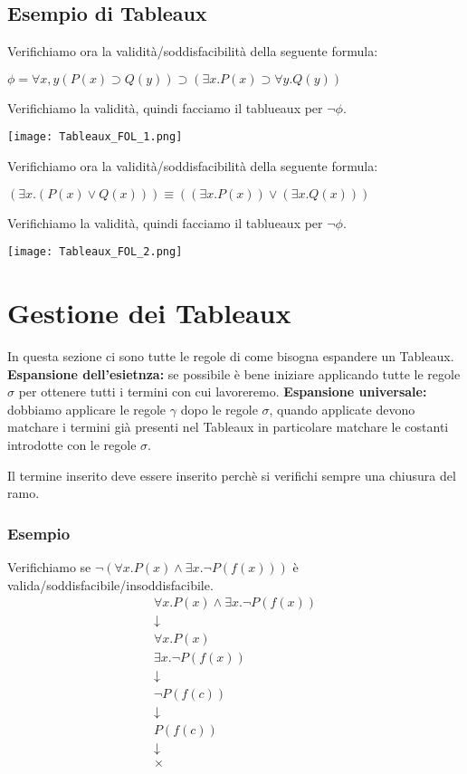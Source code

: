 \documentclass[../main.tex]{subfiles}
\begin{document}
   \subsection{Esempio di Tableaux}
   Verifichiamo ora la validità/soddisfacibilità della seguente formula:
   \begin{center}
      $\phi =  \forall x, y(P(x) \supset Q(y))  \supset ( \exists x.P(x)  \supset  \forall y.Q(y))$
   \end{center}
   Verifichiamo la validità, quindi facciamo il tablueaux per $\lnot \phi$.
   \begin{center}
      \texttt{[image: Tableaux\_FOL\_1.png]}
   \end{center}
   \vspace{4ex}
   Verifichiamo ora la validità/soddisfacibilità della seguente formula:
   \begin{center}
      $( \exists x.(P(x)  \lor Q(x))) \equiv (( \exists x.P(x))  \lor ( \exists x.Q(x)))$
   \end{center}
   Verifichiamo la validità, quindi facciamo il tablueaux per $\lnot \phi$.
   \begin{center}
      \texttt{[image: Tableaux\_FOL\_2.png]}
   \end{center}

   \section{Gestione dei Tableaux}
   In questa sezione ci sono tutte le regole di come bisogna espandere un Tableaux.
   \spazio
   \textbf{Espansione dell'esietnza:} se possibile è bene iniziare applicando tutte le regole $\sigma$ per ottenere tutti i termini con cui lavoreremo.
   \spazio
   \textbf{Espansione universale:} dobbiamo applicare le regole $\gamma$ dopo le regole $\sigma$, quando applicate devono matchare i termini già presenti nel Tableaux in particolare matchare le costanti introdotte con le regole $\sigma$.

   Il termine inserito deve essere inserito perchè si verifichi sempre una chiusura del ramo.

   \subsubsection{Esempio}
   Verifichiamo se $\lnot (\forall x.P(x) \land \exists x. \lnot P(f(x)))$ è valida/soddisfacibile/insoddisfacibile.
   \begin{gather*}
      \forall x.P(x) \land \exists x. \lnot P(f(x))\\
      \downarrow\\
      \forall x.P(x)\\
      \exists x. \lnot P(f(x))\\
      \downarrow\\
      \lnot P(f(c))\\
      \downarrow\\
      P(f(c))\\
      \downarrow\\
      \times
   \end{gather*} 
\end{document}
